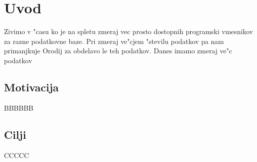 \chapter{Uvod}

Zivimo v "casu ko je na spletu zmeraj vec prosto dostopnih programski vmesnikov
za razne podatkovne baze. Pri zmeraj ve"cjem "stevilu podatkov pa nam primanjkuje
Orodij za obdelavo le teh podatkov. 
Danes imamo zmeraj ve"c podatkov

\section{Motivacija}

BBBBBB

\section{Cilji}

CCCCC

